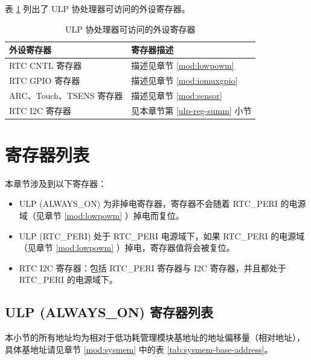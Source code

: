 \documentclass[main\_\_CN.tex]{subfiles}
\begin{document}
表 \ref{tab:assiable-registers} 列出了 ULP 协处理器可访问的外设寄存器。

\begin{table}[H]
    \centering
    \caption{ULP 协处理器可访问的外设寄存器}\label{tab:assiable-registers}

    \begin{threeparttable}
    \begin{tabular}[c]{|p{6cm}|p{10cm}|}
    \hline
        \rowcolor{lightgray}
\textbf{外设寄存器} & \textbf{寄存器描述} \\\hline
RTC CNTL 寄存器 & 描述见章节 \ref{mod:lowpowm} \textit{\nameref{mod:lowpowm}} \\\hline
RTC GPIO 寄存器& 描述见章节 \ref{mod:iomuxgpio} \textit{\nameref{mod:iomuxgpio}} \\\hline
ARC、Touch、TSENS 寄存器 & 描述见章节 \ref{mod:sensor} \textit{\nameref{mod:sensor}} \\\hline
RTC I2C 寄存器 & 见本章节第 \ref{ulp-reg-summ} 小节 \textit{\nameref{ulp-reg-summ}} \\\hline
\end{tabular}
     \end{threeparttable}
    \end{table}

\hypertarget{ulp-reg-summ}{}
\section{寄存器列表}
\label{sec:ulp-reg-summ}

本章节涉及到以下寄存器：
\begin{itemize}
   \item ULP (ALWAYS\_ON) 为非掉电寄存器，寄存器不会随着 RTC\_PERI 的电源域（见章节 \ref{mod:lowpowm} \textit{}）掉电而复位。
    \item ULP (RTC\_PERI) 处于 RTC\_PERI 电源域下，如果 RTC\_PERI 的电源域（见章节 \ref{mod:lowpowm} \textit{}）掉电，寄存器值将会被复位。
    \item RTC I2C 寄存器：包括 RTC\_PERI 寄存器与 I2C 寄存器，并且都处于 RTC\_PERI 的电源域下。
\end{itemize}

\subsection{ULP (ALWAYS\_ON) 寄存器列表}

本小节的所有地址均为相对于低功耗管理模块基地址的地址偏移量（相对地址），具体基地址请见章节 \ref{mod:sysmem} \textit{} 中的表 \ref{tab:sysmem-base-address}。

\end{document}
